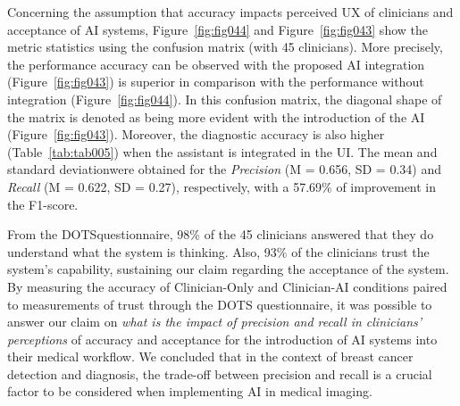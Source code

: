Concerning the assumption that accuracy impacts perceived \ac{UX} of clinicians and acceptance of \ac{AI} systems, Figure~\ref{fig:fig044} and Figure~\ref{fig:fig043} show the metric statistics using the confusion matrix (with 45 clinicians).
More precisely, the performance accuracy can be observed with the proposed \ac{AI} integration (Figure~\ref{fig:fig043}) is superior in comparison with the performance without integration (Figure~\ref{fig:fig044}).
In this confusion matrix, the diagonal shape of the matrix is denoted as being more evident with the introduction of the \ac{AI} (Figure~\ref{fig:fig043}).
Moreover, the diagnostic accuracy is also higher (Table~\ref{tab:tab005}) when the assistant is integrated in the \ac{UI}.
The mean and standard deviation\footnotemark[24] were obtained for the {\it Precision} (M = 0.656, SD = 0.34) and {\it Recall} (M = 0.622, SD = 0.27), respectively, with a 57.69\% of improvement in the F1-score.




From the \ac{DOTS}\footnotemark[25] questionnaire, 98\% of the 45 clinicians answered that they do understand what the system is thinking.
Also, 93\% of the clinicians trust the system's capability, sustaining our claim regarding the acceptance of the system.
By measuring the accuracy of Clinician-Only and Clinician-AI conditions paired to measurements of trust through the \ac{DOTS} questionnaire, it was possible to answer our claim on {\it what is the impact of precision and recall in clinicians' perceptions} of accuracy and acceptance for the introduction of \ac{AI} systems into their medical workflow.
We concluded that in the context of breast cancer detection and diagnosis, the trade-off between precision and recall is a crucial factor to be considered when implementing \ac{AI} in medical imaging.


